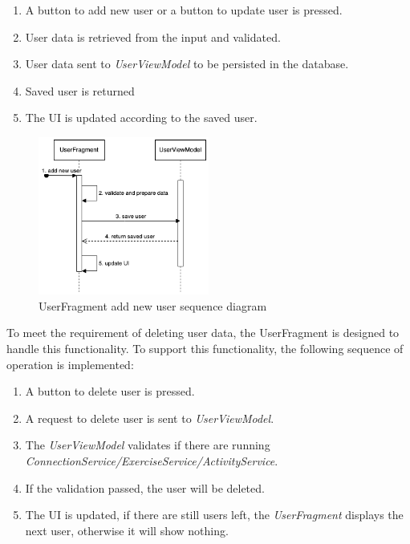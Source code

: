 \begin{enumerate}
    \item A button to add new user or a button to update user is pressed.
    \item User data is retrieved from the input and validated.
    \item User data sent to \emph{UserViewModel} to be persisted in the database.
    \item Saved user is returned
    \item The UI is updated according to the saved user.
\end{enumerate}

\begin{figure}[H]
    \centering
    \includegraphics[width=0.5\textwidth]{diagrams/create-user-seq.drawio.png}
    \caption{UserFragment add new user sequence diagram}
    \label{fig:userfragment_add_new_user}
\end{figure}

To meet the requirement of deleting user data, the UserFragment is designed to handle this functionality. 
To support this functionality, the following sequence of operation is implemented:

\begin{enumerate}
    \item A button to delete user is pressed.
    \item A request to delete user is sent to \emph{UserViewModel}.
    \item The \emph{UserViewModel} validates if there are running \emph{ConnectionService/ExerciseService/ActivityService}.
    \item If the validation passed, the user will be deleted.
    \item The UI is updated, if there are still users left, the \emph{UserFragment} displays the next user, otherwise it will show nothing.
\end{enumerate}

